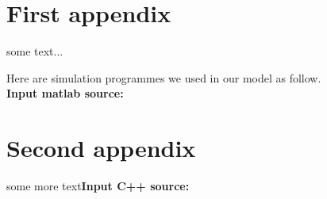 \begin{appendices}

\section{First appendix}

some text...


Here are simulation programmes we used in our model as follow.\\


\textbf{\textcolor[rgb]{0.98,0.00,0.00}{Input matlab source:}}



      \section{Second appendix}

    some more text\textcolor[rgb]{0.98,0.00,0.00}{\textbf{Input C++ source:}}


    \end{appendices}
